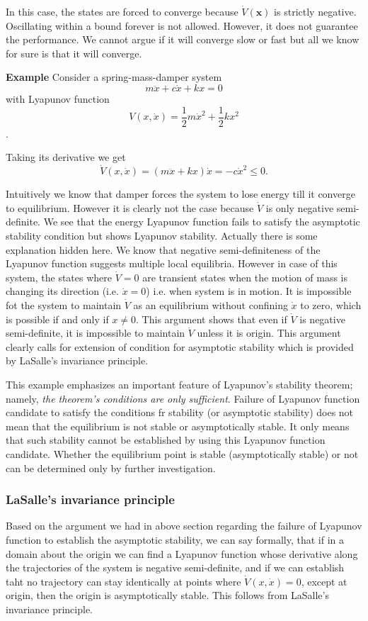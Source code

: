\documentclass{article}
\begin{document}
In this case, the states are forced to converge because $\dot{V}(\bm{x})$ is strictly negative. Oscillating within a bound forever is not allowed. However, it does not guarantee the performance. We cannot argue if it will converge slow or fast but all we know for sure is that it will converge.

\noindent
\textbf{Example}
Consider a spring-mass-damper system $$m\ddot{x}+c\dot{x}+kx=0$$ with Lyapunov function $$V(x,\dot{x})=\frac{1}{2}m\dot{x}^{2}+\frac{1}{2}kx^{2}$$.

Taking its derivative we get
$$
\dot{V}(x,\dot{x})=(m\ddot{x}+kx)\dot{x}=-c\dot{x}^{2}\leq0.
$$

Intuitively we know that damper forces the system to lose energy till it converge to equilibrium. However it is clearly not the case because $\dot{V}$ is only negative semi-definite. We see that the energy Lyapunov function fails to satisfy the asymptotic stability condition but shows Lyapunov stability. Actually there is some explanation hidden here. We know that negative semi-definiteness of the Lyapunov function suggests multiple local equilibria. However in case of this system, the states where $\dot{V}=0$ are transient states when the motion of mass is changing its direction (i.e. $\dot{x}=0$) i.e. when system is in motion. It is impossible fot the system to maintain $\dot{V}$ as an equilibrium without confining $\dot{x}$ to zero, which is possible if and only if $x\neq0$. This argument shows that even if $\dot{V}$ is negative semi-definite, it is impossible to maintain $\dot{V}$ unless it is origin. This argument clearly calls for extension of condition for asymptotic stability which is provided by LaSalle's invariance principle.

This example emphasizes an important feature of Lyapunov's stability theorem; namely, \textit{the theorem's conditions are only sufficient}. Failure of Lyapunov function candidate to satisfy the conditions fr stability (or asymptotic stability) does not mean that the equilibrium is not stable or asymptotically stable. It only means that such stability cannot be established by using this Lyapunov function candidate. Whether the equilibrium point is stable (asymptotically stable) or not can be determined only by further investigation. 

\subsubsection*{LaSalle's invariance principle}
Based on the argument we had in above section regarding the failure of Lyapunov function to establish the asymptotic stability, we can say formally, that if in a domain about the origin we can find a Lyapunov function whose derivative along the trajectories of the system is negative semi-definite, and if we can establish taht no trajectory can stay identically at points where $\dot{V}(x,\dot{x})=0$, except at origin, then the origin is asymptotically stable. This follows from LaSalle's invariance principle.
\end{document}
